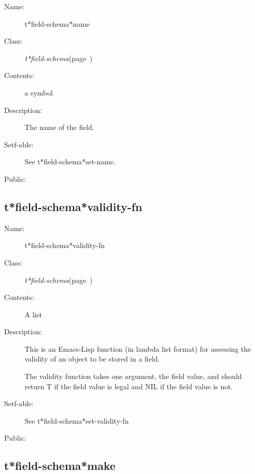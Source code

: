 \begin{description}
\item [Name:]  t*field-schema*name

\item [Class:] {\sl t*field-schema}\hfill(page~\pageref{t*field-schema})

\item [Contents:] a symbol

\item [Description:]

The name of the field. 

\item [Setf-able:] See t*field-schema*set-name.


\item [Public:]



\end{description}
\horizontalline

\subsection{t*field-schema*validity-fn}
\label{t*field-schema*validity-fn}

\begin{description}
\item [Name:]  t*field-schema*validity-fn

\item [Class:] {\sl t*field-schema}\hfill(page~\pageref{t*field-schema})

\item [Contents:] A list

\item [Description:]

This is an Emacs-Lisp function (in lambda list format) for 
assessing the validity of an object to be stored in a 
field. 

The validity function takes one argument, the field 
value, and should return T if the field value is legal
and NIL if the field value is not. 

\item [Setf-able:] See t*field-schema*set-validity-fn

\item [Public:]



\end{description}
\horizontalline

\subsection{t*field-schema*make}
\label{t*field-schema*make}

